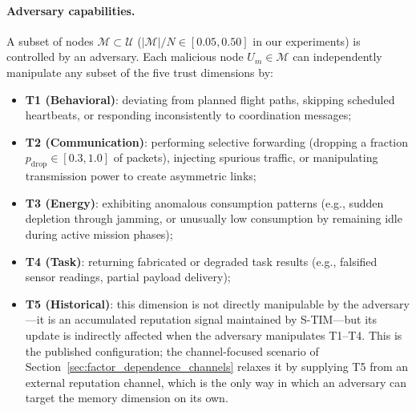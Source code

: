 \documentclass[notspecified,article,submit,moreauthors]{Definitions/mdpi}
\begin{document}
\paragraph{Adversary capabilities.}
A subset of nodes $\mathcal{M} \subset \mathcal{U}$ ($|\mathcal{M}|/N \in [0.05, 0.50]$ in our experiments) is controlled by an adversary. Each malicious node $U_m \in \mathcal{M}$ can independently manipulate any subset of the five trust dimensions by:
\begin{itemize}[topsep=0pt,itemsep=0pt]
    \item \textbf{T1 (Behavioral)}: deviating from planned flight paths, skipping scheduled heartbeats, or responding inconsistently to coordination messages;
    \item \textbf{T2 (Communication)}: performing selective forwarding (dropping a fraction $p_{\text{drop}} \in [0.3, 1.0]$ of packets), injecting spurious traffic, or manipulating transmission power to create asymmetric links;
    \item \textbf{T3 (Energy)}: exhibiting anomalous consumption patterns (e.g., sudden depletion through jamming, or unusually low consumption by remaining idle during active mission phases);
    \item \textbf{T4 (Task)}: returning fabricated or degraded task results (e.g., falsified sensor readings, partial payload delivery);
    \item \textbf{T5 (Historical)}: this dimension is not directly manipulable by the adversary---it is an accumulated reputation signal maintained by S-TIM---but its update is indirectly affected when the adversary manipulates T1--T4. This is the published configuration; the channel-focused scenario of Section~\ref{sec:factor_dependence_channels} relaxes it by supplying T5 from an external reputation channel, which is the only way in which an adversary can target the memory dimension on its own.
\end{itemize}
\end{document}
